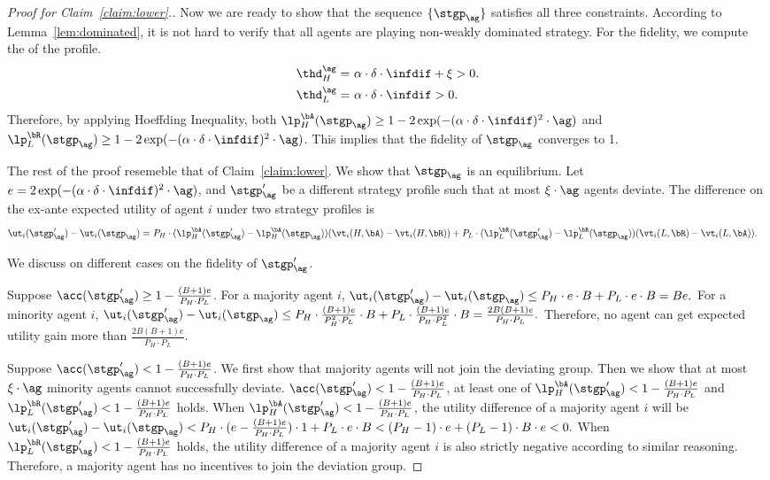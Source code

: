 \begin{proof}[Proof for Claim~\ref{claim:lower}.]
    Now we are ready to show that the sequence $\{\stgp_\ag\}$ satisfies all three constraints. According to Lemma~\ref{lem:dominated}, it is not hard to verify that all agents are playing non-weakly dominated strategy. For the fidelity, we compute the \exshare{} of the profile. 
    \begin{align*}
        \thd_H^\ag = &\ \alpha \cdot \delta \cdot \infdif + \xi > 0.\\
        \thd_L^\ag = &\ \alpha \cdot \delta \cdot \infdif > 0. 
    \end{align*}
    Therefore, by applying Hoeffding Inequality, both $\lp_H^{\bA}(\stgp_\ag) \ge 1 - 2\exp(-(\alpha \cdot \delta \cdot \infdif)^2 \cdot \ag)$ and $\lp_L^{\bR}(\stgp_\ag) \ge 1 - 2\exp(-(\alpha \cdot \delta \cdot \infdif)^2 \cdot \ag)$. This implies that the fidelity of $\stgp_\ag$ converges to 1. 

    The rest of the proof resemeble that of Claim~\ref{claim:lower}. We show that $\stgp_\ag$ is an equilibrium. Let $e = 2\exp(-(\alpha \cdot \delta \cdot \infdif)^2 \cdot \ag)$, and $\stgp'_\ag$  be a different strategy profile such that at most $\xi\cdot \ag$ agents deviate. The difference on the ex-ante expected utility of agent $i$ under two strategy profiles is 
    \begin{align*}
        \ut_{i}(\stgp'_\ag) - \ut_{i}(\stgp_\ag) = &\ P_H\cdot (\lp_{H}^{\bA}(\stgp'_\ag) - \lp_{H}^{\bA}(\stgp_\ag))(\vt_{i}(H, \bA) - \vt_{i}(H,\bR))+ P_L\cdot (\lp_{L}^{\bR}(\stgp'_\ag) - \lp_{L}^{\bR}(\stgp_\ag))(\vt_{i}(L, \bR) - \vt_{i}(L,\bA)).
    \end{align*}
    
    We discuss on different cases on the fidelity of $\stgp'_\ag$. 

    Suppose $\acc(\stgp'_\ag) \ge 1 -  \frac{(B+1)e}{P_H\cdot P_L}$. For a majority agent $i$, $\ut_{i}(\stgp'_\ag) - \ut_{i}(\stgp_\ag) \le P_H\cdot e\cdot B + P_L\cdot e\cdot B = Be.$ For a minority agent $i$, $\ut_{i}(\stgp'_\ag) - \ut_{i}(\stgp_\ag) \le P_H\cdot \frac{(B+1)e}{P_H^2\cdot P_L}\cdot B + P_L\cdot \frac{(B+1)e}{P_H\cdot P_L^2}\cdot B = \frac{2B(B+1)e}{P_H\cdot P_L}.$
    Therefore, no agent can get expected utility gain more than $\frac{2B(B+1)e}{P_H\cdot P_L}$. 

    Suppose $\acc(\stgp'_\ag) < 1 - \frac{(B+1)e}{P_H\cdot P_L}$. We first show that majority agents will not join the deviating group. Then we show that at most $\xi\cdot \ag$ minority agents cannot successfully deviate. $\acc(\stgp'_\ag) < 1 - \frac{(B+1)e}{P_H\cdot P_L}$, at least one of $\lp_H^{\bA}(\stgp'_\ag) < 1 - \frac{(B+1)e}{P_H\cdot P_L}$ and $\lp_L^{\bR}(\stgp'_\ag) < 1 - \frac{(B+1)e}{P_H\cdot P_L}$ holds. When $\lp_H^{\bA}(\stgp'_\ag) < 1 - \frac{(B+1)e}{P_H\cdot P_L}$, the utility difference of a majority agent $i$ will be $\ut_{i}(\stgp'_\ag) - \ut_{i}(\stgp_\ag) < P_H\cdot (e - \frac{(B+1)e}{P_H\cdot P_L} )\cdot 1 + P_L\cdot e\cdot B < (P_H - 1)\cdot e + (P_L -1)\cdot B \cdot e < 0.$ When $\lp_L^{\bR}(\stgp'_\ag) < 1 - \frac{(B+1)e}{P_H\cdot P_L}$ holds, the utility difference of a majority agent $i$ is also strictly negative according to similar reasoning. Therefore, a majority agent has no incentives to join the deviation group. 


\end{proof}
